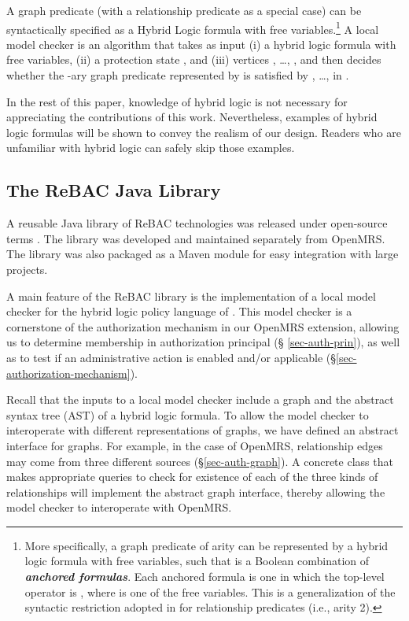 \documentclass{acm_proc_article-sp}
\newcommand{\Dfn}[1]{\textbf{\emph{#1}}}
\begin{document}
A graph predicate  (with a
relationship predicate as a special case) can be syntactically
specified as a Hybrid Logic formula  \cite{Bruns-etal:2012} with
 free variables.\footnote{ More specifically, a graph predicate of
  arity  can be represented by a hybrid logic formula  with
   free variables, such that  is a Boolean combination of
  \Dfn{anchored formulas}.  Each anchored formula is one in which the
  top-level operator is , where  is one of the free variables.
  This is a generalization of the syntactic restriction adopted in
  \cite{Bruns-etal:2012} for relationship predicates (i.e., arity 2).
} A local model checker is an algorithm that takes as input (i) a
hybrid logic formula  with  free variables, (ii) a protection
state , and (iii)  vertices , \ldots, , and then
decides whether the -ary graph predicate represented by  is
satisfied by , \ldots,  in .

In the rest of this paper, knowledge of hybrid logic is not necessary
for appreciating the contributions of this work.  Nevertheless,
examples of hybrid logic formulas will be shown to convey the realism
of our design.  Readers who are unfamiliar with hybrid logic can
safely skip those examples.

\subsection{The ReBAC Java Library}

A reusable Java library of ReBAC technologies was released under
open-source terms \cite{ReBACLib}.  The library was developed and
maintained separately from OpenMRS.  The library was also packaged as a
Maven module for easy integration with large projects.

A main feature of the ReBAC library is the implementation of a local
model checker for the hybrid logic policy language of
\cite{Bruns-etal:2012}.  This model checker is a cornerstone of the
authorization mechanism in our OpenMRS extension, allowing us to
determine membership in authorization principal (\S
\ref{sec-auth-prin}), as well as to test if an administrative action
is enabled and/or applicable (\S \ref{sec-authorization-mechanism}).

Recall that the inputs to a local model checker include a graph and
the abstract syntax tree (AST) of a hybrid logic formula.  To allow
the model checker to interoperate with different representations of
graphs, we have defined an abstract interface for graphs.  For
example, in the case of OpenMRS, relationship edges may come from
three different sources (\S \ref{sec-auth-graph}).  A concrete class
that makes appropriate queries to check for existence of each of the
three kinds of relationships will implement the abstract graph
interface, thereby allowing the model checker to interoperate with OpenMRS.
\end{document}
